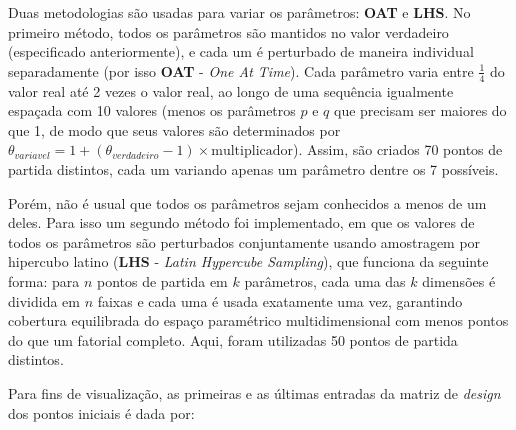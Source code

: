 \documentclass[11pt,]{article}
\begin{document}
Duas metodologias são usadas para variar os parâmetros: \textbf{OAT} e
\textbf{LHS}. No primeiro método, todos os parâmetros são mantidos no
valor verdadeiro (especificado anteriormente), e cada um é perturbado de
maneira individual separadamente (por isso \textbf{OAT} - \emph{One At
Time}). Cada parâmetro varia entre \(\frac{1}{4}\) do valor real até 2
vezes o valor real, ao longo de uma sequência igualmente espaçada com 10
valores (menos os parâmetros \(p\) e \(q\) que precisam ser maiores do
que 1, de modo que seus valores são determinados por
\(\theta_{variavel} = 1 + (\theta_{verdadeiro} - 1) \times \mathrm{multiplicador}\)).
Assim, são criados 70 pontos de partida distintos, cada um variando
apenas um parâmetro dentre os 7 possíveis.

Porém, não é usual que todos os parâmetros sejam conhecidos a menos de
um deles. Para isso um segundo método foi implementado, em que os
valores de todos os parâmetros são perturbados conjuntamente usando
amostragem por hipercubo latino (\textbf{LHS} - \emph{Latin Hypercube
Sampling}), que funciona da seguinte forma: para \(n\) pontos de partida
em \(k\) parâmetros, cada uma das \(k\) dimensões é dividida em \(n\)
faixas e cada uma é usada exatamente uma vez, garantindo cobertura
equilibrada do espaço paramétrico multidimensional com menos pontos do
que um fatorial completo. Aqui, foram utilizadas 50 pontos de partida
distintos.

Para fins de visualização, as primeiras e as últimas entradas da matriz
de \emph{design} dos pontos iniciais é dada por:
\end{document}

